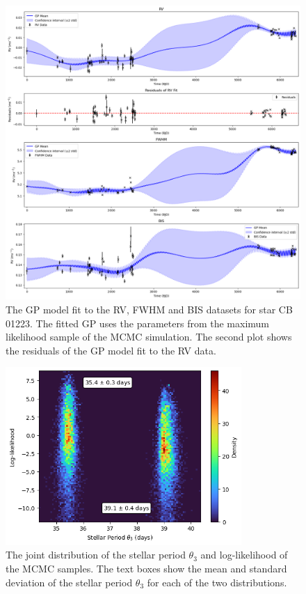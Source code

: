 \begin{figure}[htb]
    \centering
    \includegraphics[width=1\textwidth]{figures/stellar_noise_fit}
    \caption{The GP model fit to the RV, FWHM and BIS datasets for star CB 01223.
    The fitted GP uses the parameters from the maximum likelihood sample of the MCMC simulation.
    The second plot shows the residuals of the GP model fit to the RV data.}
    \label{fig:stellar_noise_fit}
\end{figure}

\begin{figure}[htb]
    \centering
    \includegraphics[width=0.8\textwidth]{figures/stellar_period_2dhist}
    \caption{The joint distribution of the stellar period $\theta_{3}$ and log-likelihood of the MCMC samples.
    The text boxes show the mean and standard deviation of the stellar period $\theta_{3}$ for each of the two distributions.}
    \label{fig:stellar_period_2dhist}
\end{figure}

